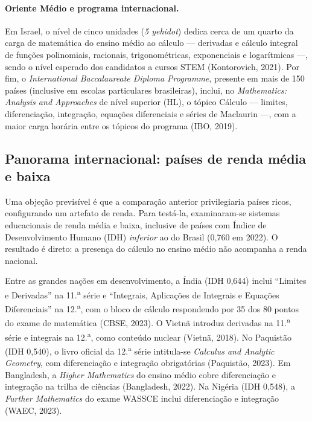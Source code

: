 \documentclass[12pt,a4paper,oneside]{article}
\begin{document}
\paragraph{Oriente Médio e programa internacional.} Em Israel, o nível de
cinco unidades (\emph{5 yehidot}) dedica cerca de um quarto da carga de
matemática do ensino médio ao cálculo --- derivadas e cálculo integral de
funções polinomiais, racionais, trigonométricas, exponenciais e
logarítmicas ---, sendo o nível esperado dos candidatos a cursos STEM
(Kontorovich, 2021). Por fim, o \emph{International Baccalaureate Diploma
Programme}, presente em mais de 150 países (inclusive em escolas
particulares brasileiras), inclui, no \emph{Mathematics: Analysis and
Approaches} de nível superior (HL), o tópico Cálculo --- limites,
diferenciação, integração, equações diferenciais e séries de Maclaurin
---, com a maior carga horária entre os tópicos do programa (IBO, 2019).

\subsection{Panorama internacional: países de renda média e baixa}
\label{sec:desenvolvimento}

Uma objeção previsível é que a comparação anterior privilegiaria países
ricos, configurando um artefato de renda. Para testá-la, examinaram-se
sistemas educacionais de renda média e baixa, inclusive de países com
Índice de Desenvolvimento Humano (IDH) \emph{inferior} ao do Brasil
(0,760 em 2022). O resultado é direto: a presença do cálculo no ensino
médio não acompanha a renda nacional.

Entre as grandes nações em desenvolvimento, a Índia (IDH 0,644) inclui
``Limites e Derivadas'' na 11.\textsuperscript{a} série e
``Integrais, Aplicações de Integrais e Equações Diferenciais'' na
12.\textsuperscript{a}, com o bloco de cálculo respondendo por 35 dos 80
pontos do exame de matemática (CBSE, 2023). O Vietnã introduz derivadas
na 11.\textsuperscript{a} série e integrais na 12.\textsuperscript{a},
como conteúdo nuclear (Vietnã, 2018). No Paquistão (IDH 0,540), o livro
oficial da 12.\textsuperscript{a} série intitula-se \emph{Calculus and
Analytic Geometry}, com diferenciação e integração obrigatórias
(Paquistão, 2023). Em Bangladesh, a \emph{Higher Mathematics} do ensino
médio cobre diferenciação e integração na trilha de ciências (Bangladesh,
2022). Na Nigéria (IDH 0,548), a \emph{Further Mathematics} do exame
WASSCE inclui diferenciação e integração (WAEC, 2023).
\end{document}
